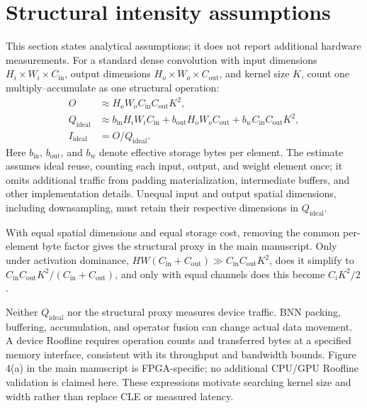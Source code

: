 \documentclass[preprint,review,12p,times]{elsarticle}
\begin{document}
\section{Structural intensity assumptions}
\label{sec:structural_intensity}
This section states analytical assumptions; it does not report additional hardware measurements. For a standard dense convolution with input dimensions $H_i\times W_i\times C_{\mathrm{in}}$, output dimensions $H_o\times W_o\times C_{\mathrm{out}}$, and kernel size $K$, count one multiply--accumulate as one structural operation:
\begin{align}
O &\approx H_oW_oC_{\mathrm{in}}C_{\mathrm{out}}K^2,\\
Q_{\mathrm{ideal}} &\approx b_{\mathrm{in}}H_iW_iC_{\mathrm{in}}
 + b_{\mathrm{out}}H_oW_oC_{\mathrm{out}}
 + b_w C_{\mathrm{in}}C_{\mathrm{out}}K^2,\\
I_{\mathrm{ideal}} &= O/Q_{\mathrm{ideal}}.
\end{align}
Here $b_{\mathrm{in}}$, $b_{\mathrm{out}}$, and $b_w$ denote effective storage bytes per element. The estimate assumes ideal reuse, counting each input, output, and weight element once; it omits additional traffic from padding materialization, intermediate buffers, and other implementation details. Unequal input and output spatial dimensions, including downsampling, must retain their respective dimensions in $Q_{\mathrm{ideal}}$.

With equal spatial dimensions and equal storage cost, removing the common per-element byte factor gives the structural proxy in the main manuscript. Only under activation dominance, $HW(C_{\mathrm{in}}+C_{\mathrm{out}})\gg C_{\mathrm{in}}C_{\mathrm{out}}K^2$, does it simplify to $C_{\mathrm{in}}C_{\mathrm{out}}K^2/(C_{\mathrm{in}}+C_{\mathrm{out}})$, and only with equal channels does this become $C_iK^2/2$.

Neither $Q_{\mathrm{ideal}}$ nor the structural proxy measures device traffic. BNN packing, buffering, accumulation, and operator fusion can change actual data movement. A device Roofline requires operation counts and transferred bytes at a specified memory interface, consistent with its throughput and bandwidth bounds. Figure 4(a) in the main manuscript is FPGA-specific; no additional CPU/GPU Roofline validation is claimed here. These expressions motivate searching kernel size and width rather than replace CLE or measured latency.

\FloatBarrier


\end{document}
